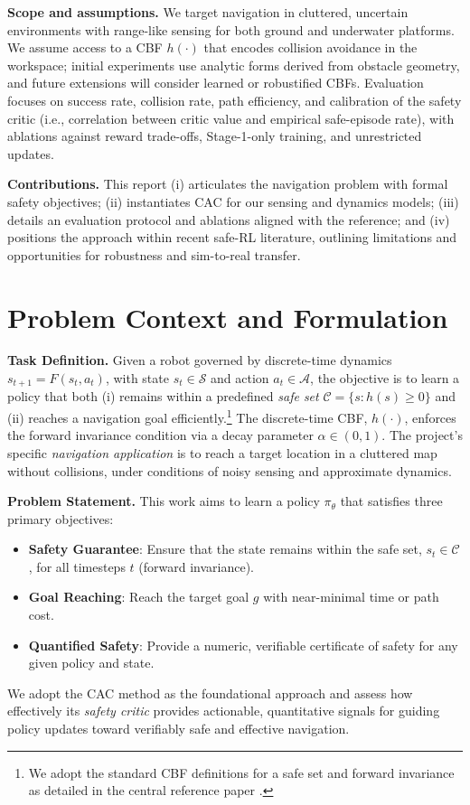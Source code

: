 \documentclass[10pt,conference]{IEEEtran}
\begin{document}
\textbf{Scope and assumptions.} We target navigation in cluttered, uncertain environments with range-like sensing for both ground and underwater platforms. We assume access to a CBF $h(\cdot)$ that encodes collision avoidance in the workspace; initial experiments use analytic forms derived from obstacle geometry, and future extensions will consider learned or robustified CBFs. Evaluation focuses on success rate, collision rate, path efficiency, and calibration of the safety critic (i.e., correlation between critic value and empirical safe-episode rate), with ablations against reward trade-offs, Stage-1-only training, and unrestricted updates.

\textbf{Contributions.} This report (i) articulates the navigation problem with formal safety objectives; (ii) instantiates CAC for our sensing and dynamics models; (iii) details an evaluation protocol and ablations aligned with the reference; and (iv) positions the approach within recent safe-RL literature, outlining limitations and opportunities for robustness and sim-to-real transfer.

\section{Problem Context and Formulation}

\textbf{Task Definition.} Given a robot governed by discrete-time dynamics $s_{t+1}=F(s_t,a_t)$, with state $s_t\in\mathcal{S}$ and action $a_t\in\mathcal{A}$, the objective is to learn a policy that both (i) remains within a predefined \emph{safe set} $\mathcal{C}=\{s: h(s)\ge 0\}$ and (ii) reaches a navigation goal efficiently.\footnote{We adopt the standard CBF definitions for a safe set and forward invariance as detailed in the central reference paper \cite{Xie2025CAC}.} The discrete-time CBF, $h(\cdot)$, enforces the forward invariance condition via a decay parameter $\alpha\in(0,1)$. The project’s specific \emph{navigation application} is to reach a target location in a cluttered map without collisions, under conditions of noisy sensing and approximate dynamics.

\textbf{Problem Statement.}
This work aims to learn a policy $\pi_\theta$ that satisfies three primary objectives:
\begin{itemize}
    \item \textbf{Safety Guarantee}: Ensure that the state remains within the safe set, $s_t\in \mathcal{C}$, for all timesteps $t$ (forward invariance).
    \item \textbf{Goal Reaching}: Reach the target goal $g$ with near-minimal time or path cost.
    \item \textbf{Quantified Safety}: Provide a numeric, verifiable certificate of safety for any given policy and state.
\end{itemize}
We adopt the CAC method as the foundational approach and assess how effectively its \emph{safety critic} provides actionable, quantitative signals for guiding policy updates toward verifiably safe and effective navigation.
\end{document}
